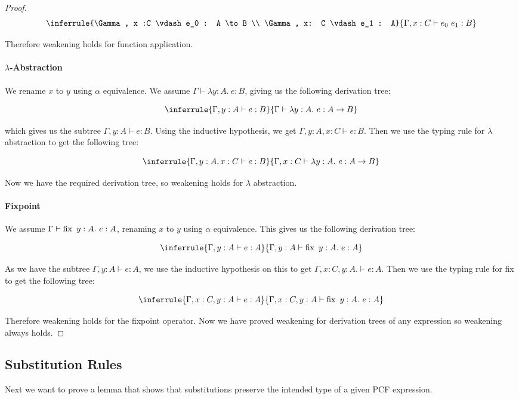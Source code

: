 \begin{proof}
$$
\inferrule{\Gamma, x :C \vdash e_0 : A \to B \\ \Gamma, x: C \vdash e_1 : A}{\Gamma, x : C \vdash e_0 \ e_1 : B}
$$

Therefore weakening holds for function application.


\paragraph{$\lambda$-Abstraction} We rename $x$ to $y$ using $\alpha$ equivalence. We assume $\Gamma \vdash \lambda y : A. \ e : B$, giving us the following derivation tree:

$$
\inferrule{\Gamma, y : A \vdash e : B}{\Gamma \vdash \lambda y : A. \ e : A \to B}
$$

which gives us the subtree $\Gamma , y:A \vdash e : B$. Using the inductive hypothesis, we get $\Gamma , y:A , x : C \vdash e : B$. Then we use the typing rule for $\lambda$ abstraction to get the following tree:

$$
\inferrule{\Gamma, y : A, x : C \vdash e : B}{\Gamma, x : C \vdash \lambda y : A. \ e : A \to B}
$$

Now we have the required derivation tree, so weakening holds for $\lambda$ abstraction.
 

\paragraph{Fixpoint}
 
We assume $\Gamma \vdash \operatorname{fix} \ y :A. \ e: A$, renaming $x$ to $y$ using $\alpha$ equivalence. This gives us the following derivation tree:

$$
\inferrule{\Gamma, y:A \vdash e : A}{\Gamma, y : A \vdash \fix \ y : A. \ e : A}
$$

As we have the subtree $\Gamma, y:A \vdash e : A$, we use the inductive hypothesis on this to get $\Gamma, x :C, y:A. \vdash e : A$. Then we use the typing rule for fix to get the following tree:

$$
\inferrule{\Gamma, x : C, y:A \vdash e : A}{\Gamma, x : C, y : A \vdash \fix \ y : A. \ e : A}
$$

Therefore weakening holds for the fixpoint operator. Now we have proved weakening for derivation trees of any expression so weakening always holds.


\end{proof}


\subsection{Substitution Rules} 
Next we want to prove a lemma that shows that substitutions preserve the intended type of a given PCF expression.

